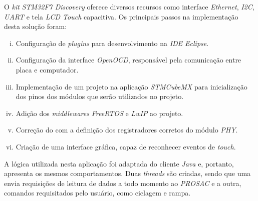 O \textit{kit} \textit{STM32F7 Discovery} oferece diversos recursos
como interface \textit{Ethernet}, \textit{I2C}, \textit{UART} e tela
\textit{LCD Touch} capacitiva. Os principais passos na implementação desta
solução foram:

\begin{enumerate} [i.]
  \item Configuração de \textit{plugins} para desenvolvimento na \textit{IDE
  Eclipse}.
  \item Configuração da interface \textit{OpenOCD}, responsável pela comunicação
  entre placa e computador.
  \item Implementação de um projeto na aplicação \textit{STMCubeMX} para
  inicialização dos pinos dos módulos que serão utilizados no projeto.
  \item Adição dos \textit{middlewares} \textit{FreeRTOS} e \textit{LwIP} ao
  projeto.
  \item Correção do  com a definição dos
  registradores corretos do módulo \textit{PHY}.
  \item Criação de uma interface gráfica, capaz de reconhecer
  eventos de \textit{touch}.
\end{enumerate}

A lógica utilizada nesta aplicação foi adaptada do cliente \textit{Java} e,
portanto, apresenta os mesmos comportamentos. Duas \textit{threads} são criadas,
sendo que uma envia requisições de leitura de dados a todo momento ao
\textit{PROSAC} e a outra, comandos requisitados pelo usuário, como ciclagem e
rampa.
